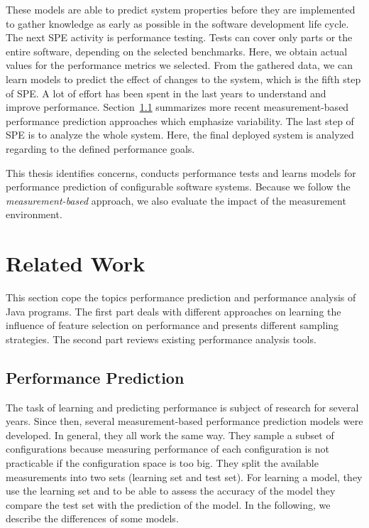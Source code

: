 These models are able to predict system properties before they are implemented to gather knowledge as early as possible in the software development life cycle.
The next \ac{SPE} activity is performance testing. 
Tests can cover only parts or the entire software, depending on the selected benchmarks. 
Here, we obtain actual values for the performance metrics we selected.
From the gathered data, we can learn models to predict the effect of changes to the system, which is the fifth step of \ac{SPE}. 
A lot of effort has been spent in the last years to understand and improve performance. 
Section~\ref{rel_perf_pred} summarizes more recent measurement-based performance prediction approaches which emphasize variability.
The last step of \ac{SPE} is to analyze the whole system.
Here, the final deployed system is analyzed regarding to the defined performance goals.

This thesis identifies concerns, conducts performance tests and learns models for performance prediction of configurable software systems. 
Because we follow the \textit{measurement-based} approach, we also evaluate the impact of the measurement environment. 


\section{Related Work}
\label{rel_work}

This section cope the topics performance prediction and performance analysis of Java programs. The first part deals with different approaches on learning the influence of feature selection on performance and presents different sampling strategies. The second part reviews existing performance analysis tools.

\subsection{Performance Prediction}
\label{rel_perf_pred}

The task of learning and predicting performance is subject of research for several years. Since then, several measurement-based performance prediction models were developed. In general, they all work the same way. They sample a subset of configurations because measuring performance of each configuration is not practicable if the configuration space is too big. They split the available measurements into two sets (learning set and test set). For learning a model, they use the learning set and to be able to assess the accuracy of the model they compare the test set with the prediction of the model. In the following, we describe the differences of some models.

